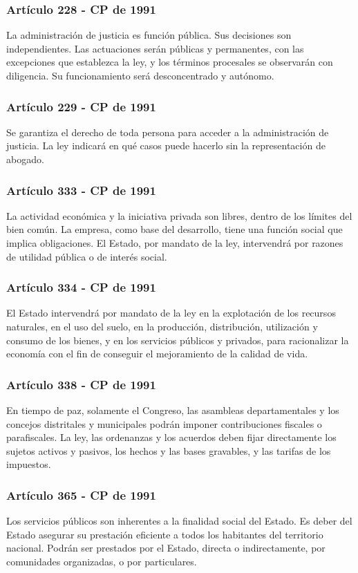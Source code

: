 \begin{frame}
  \frametitle{Art\'iculo 228 - CP de 1991}
  La administraci\'on de justicia es funci\'on p\'ublica. Sus decisiones son independientes. Las actuaciones ser\'an p\'ublicas y permanentes, con las excepciones que establezca la ley, y los t\'erminos procesales se observar\'an con diligencia. Su funcionamiento ser\'a desconcentrado y aut\'onomo.
\end{frame}

\begin{frame}
  \frametitle{Art\'iculo 229 - CP de 1991}
  Se garantiza el derecho de toda persona para acceder a la administraci\'on de justicia. La ley indicar\'a en qu\'e casos puede hacerlo sin la representaci\'on de abogado.
\end{frame}

\begin{frame}
  \frametitle{Art\'iculo 333 - CP de 1991}
  La actividad econ\'omica y la iniciativa privada son libres, dentro de los l\'imites del bien com\'un. La empresa, como base del desarrollo, tiene una funci\'on social que implica obligaciones. El Estado, por mandato de la ley, intervendr\'a por razones de utilidad p\'ublica o de inter\'es social.
\end{frame}

\begin{frame}
  \frametitle{Art\'iculo 334 - CP de 1991}
  El Estado intervendr\'a por mandato de la ley en la explotaci\'on de los recursos naturales, en el uso del suelo, en la producci\'on, distribuci\'on, utilizaci\'on y consumo de los bienes, y en los servicios p\'ublicos y privados, para racionalizar la econom\'ia con el fin de conseguir el mejoramiento de la calidad de vida.
\end{frame}

\begin{frame}
  \frametitle{Art\'iculo 338 - CP de 1991}
  En tiempo de paz, solamente el Congreso, las asambleas departamentales y los concejos distritales y municipales podr\'an imponer contribuciones fiscales o parafiscales. La ley, las ordenanzas y los acuerdos deben fijar directamente los sujetos activos y pasivos, los hechos y las bases gravables, y las tarifas de los impuestos.
\end{frame}

\begin{frame}
  \frametitle{Art\'iculo 365 - CP de 1991}
  Los servicios p\'ublicos son inherentes a la finalidad social del Estado. Es deber del Estado asegurar su prestaci\'on eficiente a todos los habitantes del territorio nacional. Podr\'an ser prestados por el Estado, directa o indirectamente, por comunidades organizadas, o por particulares.
\end{frame}

